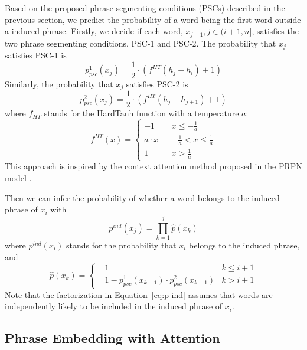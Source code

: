 \documentclass[11pt,a4paper]{article}
\begin{document}
Based on the proposed phrase segmenting conditions (PSCs) described in the previous section, we predict the probability of a word being the first word outside a induced phrase. Firstly, we decide if each word, $x_{j-1}, j \in (i+1, n]$, satisfies the two phrase segmenting conditions, PSC-1 and PSC-2. The probability that $x_j$ satisfies PSC-1 is 
\begin{equation}
\label{eq:psc-1}
p_{psc}^1 (x_j) = \frac{1}{2} \cdot (f^{HT} (h_j - h_i) + 1)
\end{equation}
Similarly, the probability that $x_j$ satisfies PSC-2 is
\begin{equation}
\label{eq:psc-2}
p_{psc}^2 (x_j) = \frac{1}{2} \cdot (f^{HT} (h_j - h_{j+1}) + 1)
\end{equation}
where $f_{HT}$ stands for the HardTanh function with a temperature $a$:
$$ f^{HT} (x)=\left\{
\begin{array}{rcl}
-1       &      & {x      \leq      -\frac{1}{a}}\\
a \cdot x     &      & {-\frac{1}{a} < x \leq \frac{1}{a}}\\
1     &      & {x > \frac{1}{a}}
\end{array} \right. $$
This approach is inspired by the context attention method proposed in the PRPN model \cite{shen2017neural}.

Then we can infer the probability of whether a word belongs to the induced phrase of $x_i$ with \begin{equation}
\label{eq:p-ind}
p^{ind} (x_j) = \prod_{k=1}^j \hat{p}(x_k)
\end{equation}
where $p^{ind} (x_i)$ stands for the probability that $x_i$ belongs to the induced phrase, and 
$$ \scriptstyle \hat{p} (x_k)=\left\{
\begin{array}{rcl}
& 1             & {k      \leq      i+1}\\
& 1 - p_{psc}^1 (x_{k-1}) \cdot p_{psc}^2 (x_{k-1})           & {k > i+1}
\end{array} \right. $$
Note that the factorization in Equation~\ref{eq:p-ind} assumes that words are independently likely to be included in the induced phrase of $x_i$. 



\subsection{Phrase Embedding with Attention}
\end{document}
